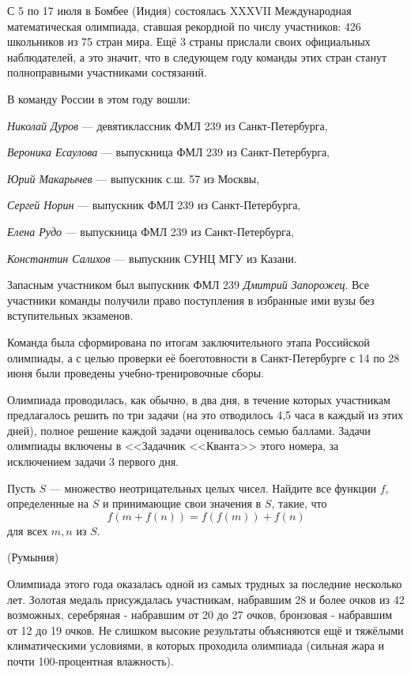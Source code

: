 \documentclass[a4paper,9pt]{article}
\begin{document}
\begin{multicols}{3}

С 5 по 17 июля в Бомбее (Индия) состоялась XXXVII Международная математическая олимпиада, ставшая рекордной по числу участников: 426 школьников из 75 стран мира. Ещё 3 страны прислали своих официальных наблюдателей, а это значит, что в следующем году команды этих стран станут полноправными участниками состязаний.

В команду России в этом году вошли:

\textit{Николай Дуров} — девятиклассник ФМЛ 239 из Санкт-Петербурга, 

\textit{Вероника Есаулова} — выпускница ФМЛ 239 из Санкт-Петербурга, 

\textit{Юрий Макарычев} — выпускник с.ш. 57 из Москвы,  

\textit{Сергей Норин} — выпускник ФМЛ 239 из Санкт-Петербурга,  

\textit{Елена Рудо} — выпускница ФМЛ 239 из Санкт-Петербурга,  

\textit{Константин Салихов} — выпускник СУНЦ МГУ из Казани.

Запасным участником был выпускник ФМЛ 239 \textit{Дмитрий Запорожец}. Все участники команды получили право поступления в избранные ими вузы без вступительных экзаменов.

Команда была сформирована по итогам заключительного этапа Российской олимпиады, а с целью проверки её боеготовности в Санкт-Петербурге с 14 по 28 июня были проведены учебно-тренировочные сборы.


Олимпиада проводилась, как обычно, в два дня, в течение которых участникам предлагалось решить по три задачи (на это отводилось 4,5 часа в каждый из этих дней), полное решение каждой задачи оценивалось семью баллами. Задачи олимпиады включены в <<Задачник <<Кванта>> этого номера, за исключением задачи 3 первого дня.
  
Пусть \(S\) — множество неотрицательных целых чисел. Найдите все функции \(f\), определенные на \(S\) и принимающие свои значения в \(S\), такие, что\[f(m + f(n)) = f(f(m)) + f(n)\]
для всех \(m, n\) из \(S\).

\hfill (Румыния)

Олимпиада этого года оказалась одной из самых трудных за последние несколько лет. Золотая медаль присуждалась участникам, набравшим 28 и более очков из 42 возможных, серебряная - набравшим от 20 до 27 очков, бронзовая - набравшим от 12 до 19 очков. Не слишком высокие результаты объясняются ещё и тяжёлыми климатическими условиями, в которых проходила олимпиада (сильная жара и почти 100-процентная влажность).


\end{multicols}
\end{document}
